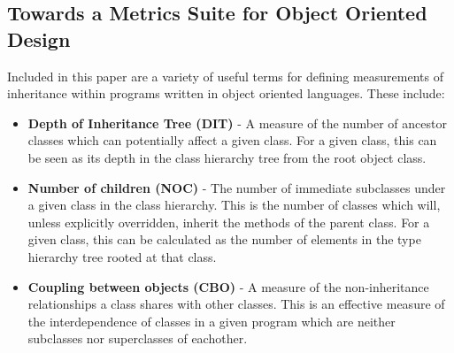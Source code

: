 \subsection{Towards a Metrics Suite for Object Oriented Design~\cite{MetricsSuite}}
Included in this paper are a variety of useful terms for defining measurements of inheritance within programs written in object oriented languages. These include:
\begin{itemize}
	\item \textbf{Depth of Inheritance Tree (DIT)} - A measure of the number of ancestor classes which can potentially affect a given class. For a given class, this can be seen as its depth in the class hierarchy tree from the root object class.
	\item \textbf{Number of children (NOC)} - The number of immediate subclasses under a given class in the class hierarchy. This is the number of classes which will, unless explicitly overridden, inherit the methods of the parent class. For a given class, this can be calculated as the number of elements in the type hierarchy tree rooted at that class. 
	\item \textbf{Coupling between objects (CBO)} - A measure of the non-inheritance relationships a class shares with other classes. This is an effective measure of the interdependence of classes in a given program which are neither subclasses nor superclasses of eachother.
\end{itemize}

